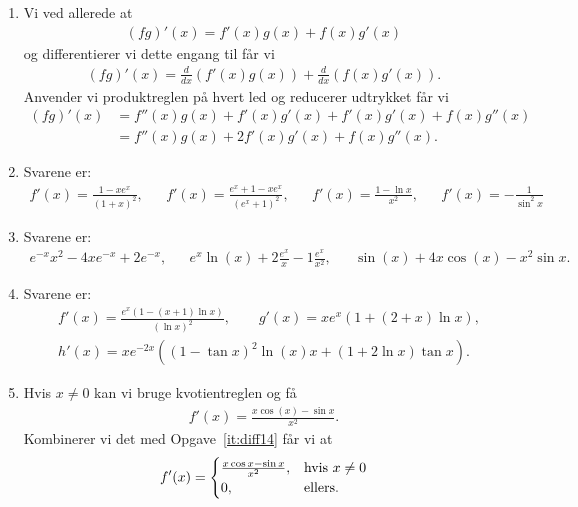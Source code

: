 \begin{enumerate}
	
	\item Vi ved allerede at
	\begin{align*}
	(fg)'(x)=f'(x)g(x)+f(x)g'(x)
	\end{align*}
	og differentierer vi dette engang til får vi
	\begin{align*}
	(fg)'(x)=\frac{d}{dx}( f'(x)g(x))+\frac{d}{dx}(f(x)g'(x)).
	\end{align*}
	Anvender vi produktreglen på hvert led og reducerer udtrykket får vi
	\begin{align*}
	(fg)'(x)&=f''(x)g(x)+f'(x)g'(x)+f'(x)g'(x)+f(x)g''(x)\\
	&=f''(x)g(x)+2f'(x)g'(x)+f(x)g''(x).
	\end{align*}
	
	\item Svarene er:
	\begin{align*}
	f'(x)=\frac{1-xe^x}{(1+x)^2},&&f'(x)=\frac{e^x+1-xe^x}{(e^x+1)^2},&&f'(x)=\frac{1-\ln x}{x^2},&& f'(x)=-\frac{1}{\sin^2 x}
	\end{align*}
	
	\item Svarene er:
	\begin{align*}
	e^{-x}x^2-4xe^{-x}+2e^{-x},&& e^x\ln(x)+ 2\frac{e^x}{x}-1\frac{e^x}{x^2},&& \sin(x)+4x\cos(x)-x^2\sin x.
	\end{align*}
	
	
	
	
	
	\item Svarene er:
	\begin{align*}
	&f'(x)=\frac{e^x(1-(x+1)\ln x)}{(\ln x)^2},\qquad g'(x)=xe^x(1+(2+x)\ln x),\\ &h'(x)=xe^{-2x}((1-\tan x)^2\ln(x)x+(1+2\ln x)\tan x).
	\end{align*}
	
	
	
	
	\item\label{it:diff22ans} Hvis $x\neq 0$ kan vi bruge kvotientreglen og få
	\begin{align*}
	f'(x)=\frac{x\cos(x)-\sin x}{x^2}.
	\end{align*}
	Kombinerer vi det med Opgave~\ref{it:diff14} får vi at
	\begin{align*}
	f'(x)=\begin{cases}
	\frac{x\cos x-\sin x}{x^2},&\textup{hvis }x\neq 0\\
	0,&\textup{ellers}. 
	\end{cases}
	\end{align*}
	

\end{enumerate}
